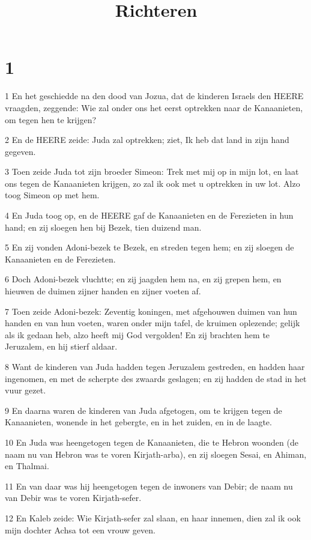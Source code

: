 

\title{Richteren}



\chapter{1}

\par 1 En het geschiedde na den dood van Jozua, dat de kinderen Israels den HEERE vraagden, zeggende: Wie zal onder ons het eerst optrekken naar de Kanaanieten, om tegen hen te krijgen?
\par 2 En de HEERE zeide: Juda zal optrekken; ziet, Ik heb dat land in zijn hand gegeven.
\par 3 Toen zeide Juda tot zijn broeder Simeon: Trek met mij op in mijn lot, en laat ons tegen de Kanaanieten krijgen, zo zal ik ook met u optrekken in uw lot. Alzo toog Simeon op met hem.
\par 4 En Juda toog op, en de HEERE gaf de Kanaanieten en de Ferezieten in hun hand; en zij sloegen hen bij Bezek, tien duizend man.
\par 5 En zij vonden Adoni-bezek te Bezek, en streden tegen hem; en zij sloegen de Kanaanieten en de Ferezieten.
\par 6 Doch Adoni-bezek vluchtte; en zij jaagden hem na, en zij grepen hem, en hieuwen de duimen zijner handen en zijner voeten af.
\par 7 Toen zeide Adoni-bezek: Zeventig koningen, met afgehouwen duimen van hun handen en van hun voeten, waren onder mijn tafel, de kruimen oplezende; gelijk als ik gedaan heb, alzo heeft mij God vergolden! En zij brachten hem te Jeruzalem, en hij stierf aldaar.
\par 8 Want de kinderen van Juda hadden tegen Jeruzalem gestreden, en hadden haar ingenomen, en met de scherpte des zwaards geslagen; en zij hadden de stad in het vuur gezet.
\par 9 En daarna waren de kinderen van Juda afgetogen, om te krijgen tegen de Kanaanieten, wonende in het gebergte, en in het zuiden, en in de laagte.
\par 10 En Juda was heengetogen tegen de Kanaanieten, die te Hebron woonden (de naam nu van Hebron was te voren Kirjath-arba), en zij sloegen Sesai, en Ahiman, en Thalmai.
\par 11 En van daar was hij heengetogen tegen de inwoners van Debir; de naam nu van Debir was te voren Kirjath-sefer.
\par 12 En Kaleb zeide: Wie Kirjath-sefer zal slaan, en haar innemen, dien zal ik ook mijn dochter Achsa tot een vrouw geven.
